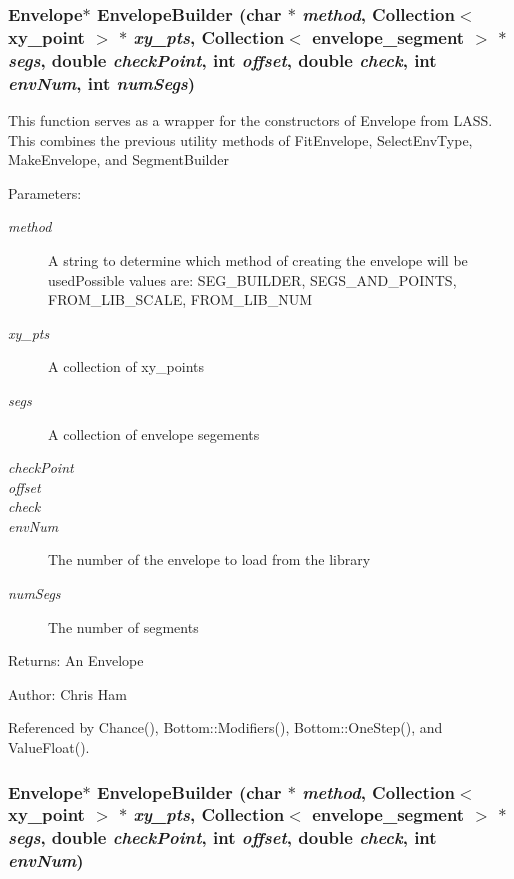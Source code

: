 \subsubsection{\setlength{\rightskip}{0pt plus 5cm}Envelope$\ast$ Envelope\-Builder (char $\ast$ {\em method}, Collection$<$ xy\_\-point $>$ $\ast$ {\em xy\_\-pts}, Collection$<$ envelope\_\-segment $>$ $\ast$ {\em segs}, double {\em check\-Point}, int {\em offset}, double {\em check}, int {\em env\-Num}, int {\em num\-Segs})}\label{utility_8h_a19}


This function serves as a wrapper for the constructors of Envelope from LASS. This combines the previous utility methods of Fit\-Envelope, Select\-Env\-Type, Make\-Envelope, and Segment\-Builder \begin{Desc}
\item[Parameters:]
\begin{description}
\item[{\em method}]A string to determine which method of creating the envelope will be used\-Possible values are: SEG\_\-BUILDER, SEGS\_\-AND\_\-POINTS, FROM\_\-LIB\_\-SCALE, FROM\_\-LIB\_\-NUM \item[{\em xy\_\-pts}]A collection of xy\_\-points \item[{\em segs}]A collection of envelope segements \item[{\em check\-Point}]\item[{\em offset}]\item[{\em check}]\item[{\em env\-Num}]The number of the envelope to load from the library \item[{\em num\-Segs}]The number of segments \end{description}
\end{Desc}
\begin{Desc}
\item[Returns:]An Envelope \end{Desc}
\begin{Desc}
\item[Author:]Chris Ham \end{Desc}


Referenced by Chance(), Bottom::Modifiers(), Bottom::One\-Step(), and Value\-Float().
\subsubsection{\setlength{\rightskip}{0pt plus 5cm}Envelope$\ast$ Envelope\-Builder (char $\ast$ {\em method}, Collection$<$ xy\_\-point $>$ $\ast$ {\em xy\_\-pts}, Collection$<$ envelope\_\-segment $>$ $\ast$ {\em segs}, double {\em check\-Point}, int {\em offset}, double {\em check}, int {\em env\-Num})}\label{utility_8h_a18}


